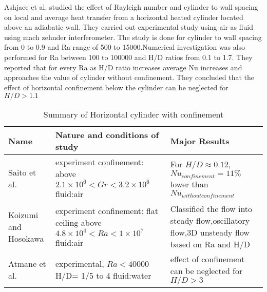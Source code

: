 Ashjaee et al.\cite{ashj11} studied the effect of Rayleigh number and cylinder to wall spacing on local and average heat transfer from a horizontal heated cylinder located above an adiabatic wall. They carried out experimental study using air as fluid using mach zehnder interferometer. The study is done for cylinder to wall spacing from 0 to 0.9 and Ra range of 500 to 15000.Numerical investigation was also performed for Ra between 100 to 100000 and H/D ratios from 0.1 to 1.7. They reported that for every Ra as H/D ratio increases average Nu increases and approaches the value of cylinder without confinement. They concluded that the effect of horizontal confinement below the cylinder can be neglected for $H/D>1.1$
\begin{table}[h]
\caption{Summary of Horizontal cylinder with confinement}
\label{tab:confinement}
\begin{center}
\begin{tabular}{|p{3cm}|p{5cm}|p{6cm}|}
\hline
Name & Nature and conditions of study & Major Results \\
 
\hline
Saito et al. & \pbox{5cm}{experiment\\confinement: above\\$2.1\times10^6<Gr<3.2\times10^6$\\fluid:air}  &\small For $H/D\approx0.12$,$Nu_{confinement}=11\%$ lower than $Nu_{without confinement}$ \\

\hline
Koizumi and Hosokawa &\pbox{5cm}{experiment\\confinement: flat ceiling above\\$4.8\times10^4<Ra<1\times10^7$\\fluid:air} & Classified the flow into steady flow,oscillatory flow,3D unsteady flow based on Ra and H/D \\
\hline
Atmane et al. & \pbox{5cm}{experimental,\\$Ra<40000$\\H/D= 1/5 to 4\\fluid:water} & effect of confinement can be neglected for $H/D>3$ \\
                

\end{tabular}
\end{center}
\end{table}
